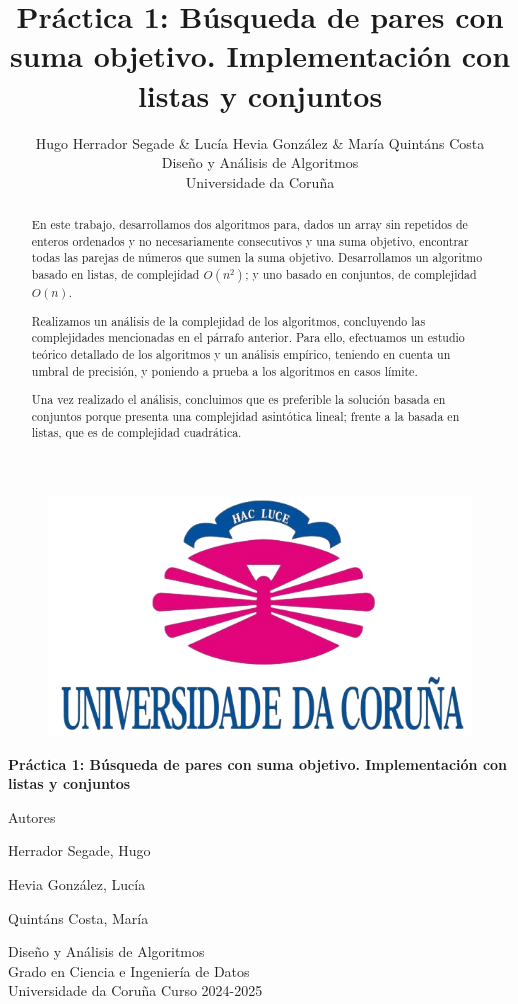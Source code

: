 \documentclass[a4paper, titlepage]{article}
\title{Práctica 1: Búsqueda de pares con suma objetivo. Implementación con listas y conjuntos}
\author{Hugo Herrador Segade \& Lucía Hevia González \& María Quintáns Costa\\
  \small Diseño y Análisis de Algoritmos\\
  \small Universidade da Coruña
}
\begin{document}
\begin{titlepage}

\centering
\begin{figure}
\centering
\includegraphics[scale = 0.2]{logos.png}
\end{figure}

\normalsize {}
\hspace{50mm}

\vspace{5cm}

\Huge
\textbf{Práctica 1: Búsqueda de pares con suma objetivo. Implementación con listas y conjuntos} 
\vfill
{\Large Autores \par}

\huge {Herrador Segade, Hugo}

\huge{Hevia González, Lucía}

\huge{Quintáns Costa, María}

\vfill
\vfill
\vfill
\vfill
\large {Diseño y Análisis de Algoritmos} \\
\large {Grado en Ciencia e Ingeniería de Datos} \\
\large {Universidade da Coruña}
\vfill
{\large Curso 2024-2025}

\clearpage 
\vfill
\end{titlepage}


\begin{abstract}

En este trabajo, desarrollamos dos algoritmos para, dados un array sin repetidos de enteros ordenados y no necesariamente consecutivos y una suma objetivo, encontrar todas las parejas de números que sumen la suma objetivo. Desarrollamos un algoritmo basado en listas, de complejidad $O(n^2)$; y uno basado en conjuntos, de complejidad $O(n)$.

Realizamos un análisis de la complejidad de los algoritmos, concluyendo las complejidades mencionadas en el párrafo anterior. Para ello, efectuamos un estudio teórico detallado de los algoritmos y un análisis empírico, teniendo en cuenta un umbral de precisión, y poniendo a prueba a los algoritmos en casos límite.

Una vez realizado el análisis, concluimos que es preferible la solución basada en conjuntos porque presenta una complejidad asintótica lineal; frente a la basada en listas, que es de complejidad cuadrática.

\vfill \end{abstract}
\end{document}
